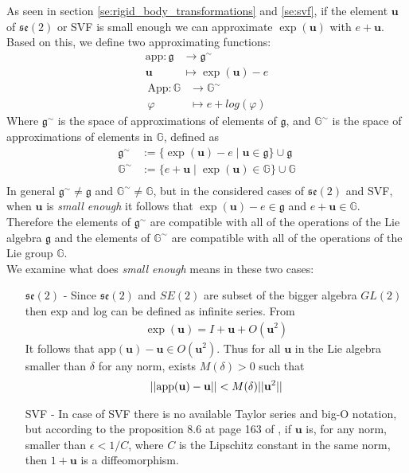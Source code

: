 \noindent
As seen in section \ref{se:rigid_body_transformations} and \ref{se:svf}, if the element $\mathbf{u}$ of $\mathfrak{se}(2)$ or SVF is small enough we can approximate $\exp(\mathbf{u})$ with $e + \mathbf{u}$. Based on this, we define two approximating functions:
\begin{align*}
\text{app} : \mathfrak{g} & \longrightarrow  \mathfrak{g}^{\sim}    \\
\mathbf{u} &\longmapsto \exp(\mathbf{u}) - e
\end{align*}
\begin{align*}
\text{App} : \mathbb{G} & \longrightarrow  \mathbb{G}^{\sim}   \\
\varphi &\longmapsto e + log(\varphi)
\end{align*}
Where $\mathfrak{g} ^{\sim}$ is the space of approximations of elements of $\mathfrak{g} $, and $\mathbb{G}^{\sim} $ is the space of approximations of elements in $\mathbb{G}$, defined as
\begin{align*}
\mathfrak{g} ^{\sim} & := \{ \exp(\mathbf{u}) - e \mid \mathbf{u}\in \mathfrak{g}\} \cup \mathfrak{g} \\
\mathbb{G}^{\sim}  & := \{ e + \mathbf{u} \mid \exp(\mathbf{u})\in \mathbb{G}\} \cup \mathbb{G} \\
\end{align*}
In general $\mathfrak{g}^{\sim} \neq \mathfrak{g}$ and $\mathbb{G}^{\sim} \neq \mathbb{G}$, but in the considered cases of $\mathfrak{se}(2)$ and SVF, when $\mathbf{u}$ is \emph{small enough}
it follows that $\exp(\mathbf{u}) - e \in \mathfrak{g} $ and $e + \mathbf{u}\in \mathbb{G}$. Therefore the elements of $\mathfrak{g}^{\sim} $ are compatible with all of the operations of the Lie algebra $\mathfrak{g}$ and the elements of $\mathbb{G}^{\sim}$ are compatible with all of the operations of the Lie group $\mathbb{G}$.\\
We examine what does \emph{small enough} means in these two cases:
\begin{enumerate}
	\item[$\mathfrak{se}(2)$ -] Since $\mathfrak{se}(2)$ and $SE(2)$ are subset of the bigger algebra $GL(2)$ then exp and log can be defined as infinite series. From 
	\begin{align*}
	\exp(\mathbf{u}) = I + \mathbf{u} + O(\mathbf{u}^2) 
	\end{align*}
	It follows that $\text{app}(\mathbf{u}) - \mathbf{u} \in O(\mathbf{u}^2)$. Thus for all $\mathbf{u}$ in the Lie algebra smaller than $\delta$ for any norm, exists $M(\delta)>0$ such that
	\begin{align*}
	\vert\lvert \text{app}(\mathbf{u}) - \mathbf{u}  \rvert\vert < M(\delta) \vert\lvert \mathbf{u}^2 \rvert\vert
	\end{align*}
	\item[SVF -] In case of SVF there is no available Taylor series and big-O notation, but according to the proposition 8.6 at page 163 of \cite{younes2010shapes}, if $\mathbf{u}$ is, for any norm, smaller than $\epsilon<1/C$, where $C$ is the Lipschitz constant in the same norm, then $1 + \mathbf{u}$ is a diffeomorphism. 
\end{enumerate}

